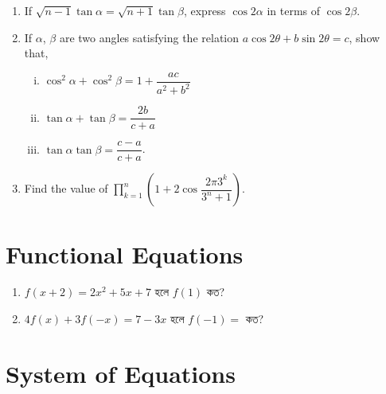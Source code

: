 \documentclass[11pt, a4paper]{article}
\begin{document}
\begin{enumerate}
	\item If $\sqrt{n-1} \tan \alpha = \sqrt{n+1} \tan \beta$, express $\cos 2\alpha$ in terms of $\cos 2\beta$.
	
	\item If $\alpha$, $\beta$ are two angles satisfying the relation $a\cos 2\theta + b \sin 2\theta = c$, show that, 
	\begin{enumerate}[(i)]
		\item $\cos^2  \alpha + \cos^2 \beta = 1 + \dfrac{ac}{a^2 + b^2}$
		\item $\tan \alpha + \tan \beta = \dfrac{2b}{c+a}$
		\item $\tan \alpha \tan \beta = \dfrac{c-a}{c+a}$.
	
	\end{enumerate}
	

	\item Find the value of $\prod \limits_{k = 1}^{n} \left( 1 + 2 \cos \dfrac{2 \pi 3^k}{3^n + 1} \right)$.
\end{enumerate}

\section{Functional Equations}

\begin{enumerate}

	\item $ f(x+2) = 2x^2 +5x+7 $ \textbengali{হলে} $ f(1) $ \textbengali{কত}?
	

	\item $ 4f(x) + 3f(-x) = 7 - 3x $ \textbengali{হলে} $ f(-1) = $  \textbengali{কত?}

\end{enumerate}

\section{System of Equations}
\end{document}
